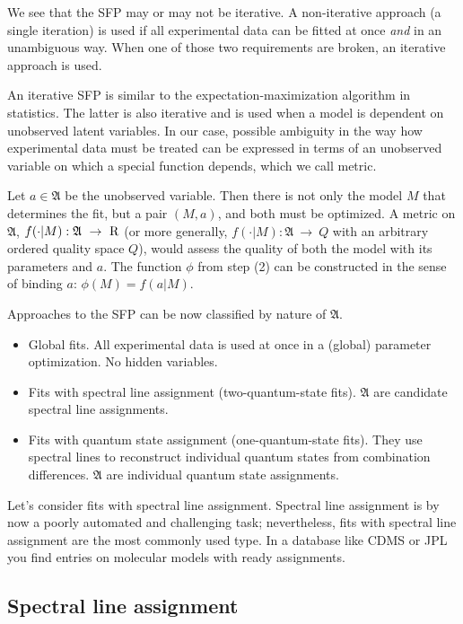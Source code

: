 \documentclass[11pt]{article}
\begin{document}
We see that the SFP may or may not be iterative. A non-iterative approach (a single iteration) is used if all experimental data can be fitted at once \emph{and} in an unambiguous way. When one of those two requirements are broken, an iterative approach is used. 

An iterative SFP is similar to the expectation-maximization algorithm in statistics. The latter is also iterative and is used when a model is dependent on unobserved latent variables. In our case, possible ambiguity in the way how experimental data must be treated can be expressed in terms of an unobserved variable on which a special function depends, which we call metric.

Let $a \in \mathfrak{A}$ be the unobserved variable. Then there is not only the model $M$ that determines the fit, but a pair $(M, a)$, and both must be optimized. A metric on $\mathfrak{A}$, $f(\cdot | M): \mathfrak{A}~\rightarrow~{\mathrm{R}}$ (or more generally, $f(\cdot | M): \mathfrak{A}~\rightarrow~Q$ with an arbitrary ordered quality space $Q$), would assess the quality of both the model with its parameters and $a$. %
The function $\phi$ from step (2) can be constructed in the sense of binding $a$: $\phi(M) = f(a | M)$.

Approaches to the SFP can be now classified by nature of $\mathfrak{A}$.
\begin{itemize}
	\item Global fits. All experimental data is used at once in a (global) parameter optimization. No hidden variables.
	\item Fits with spectral line assignment (two-quantum-state fits). $\mathfrak{A}$ are candidate spectral line assignments.
	\item Fits with quantum state assignment (one-quantum-state fits). They use spectral lines to reconstruct individual quantum states from combination differences. $\mathfrak{A}$ are individual quantum state assignments.
\end{itemize}

Let's consider fits with spectral line assignment. Spectral line assignment is by now a poorly automated and challenging task; nevertheless, fits with spectral line assignment are the most commonly used type. In a database like CDMS or JPL you find entries on molecular models with ready assignments.

\subsection{Spectral line assignment}
\end{document}
